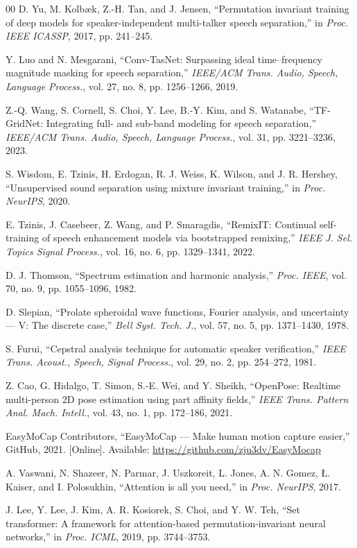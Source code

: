 \documentclass[conference]{IEEEtran}
\begin{document}
\begin{thebibliography}{00}
 D. Yu, M. Kolb\ae{}k, Z.-H. Tan, and J. Jensen,
``Permutation invariant training of deep models for speaker-independent
multi-talker speech separation,'' in \emph{Proc. IEEE ICASSP}, 2017,
pp. 241--245.

 Y. Luo and N. Mesgarani, ``Conv-TasNet:
Surpassing ideal time--frequency magnitude masking for speech separation,''
\emph{IEEE/ACM Trans. Audio, Speech, Language Process.}, vol. 27, no. 8,
pp. 1256--1266, 2019.

 Z.-Q. Wang, S. Cornell, S. Choi, Y. Lee,
B.-Y. Kim, and S. Watanabe, ``TF-GridNet: Integrating full- and sub-band
modeling for speech separation,'' \emph{IEEE/ACM Trans. Audio, Speech,
Language Process.}, vol. 31, pp. 3221--3236, 2023.

 S. Wisdom, E. Tzinis, H. Erdogan, R. J. Weiss,
K. Wilson, and J. R. Hershey, ``Unsupervised sound separation using mixture
invariant training,'' in \emph{Proc. NeurIPS}, 2020.

 E. Tzinis, J. Casebeer, Z. Wang, and
P. Smaragdis, ``RemixIT: Continual self-training of speech enhancement models
via bootstrapped remixing,'' \emph{IEEE J. Sel. Topics Signal Process.},
vol. 16, no. 6, pp. 1329--1341, 2022.

 D. J. Thomson, ``Spectrum estimation and
harmonic analysis,'' \emph{Proc. IEEE}, vol. 70, no. 9, pp. 1055--1096, 1982.

 D. Slepian, ``Prolate spheroidal wave functions,
Fourier analysis, and uncertainty --- V: The discrete case,'' \emph{Bell Syst.
Tech. J.}, vol. 57, no. 5, pp. 1371--1430, 1978.

 S. Furui, ``Cepstral analysis technique for
automatic speaker verification,'' \emph{IEEE Trans. Acoust., Speech, Signal
Process.}, vol. 29, no. 2, pp. 254--272, 1981.

 Z. Cao, G. Hidalgo, T. Simon, S.-E. Wei, and
Y. Sheikh, ``OpenPose: Realtime multi-person 2D pose estimation using part
affinity fields,'' \emph{IEEE Trans. Pattern Anal. Mach. Intell.}, vol. 43,
no. 1, pp. 172--186, 2021.

 EasyMoCap Contributors, ``EasyMoCap --- Make human motion
capture easier,'' GitHub, 2021. [Online]. Available:
\url{https://github.com/zju3dv/EasyMocap}

 A. Vaswani, N. Shazeer, N. Parmar,
J. Uszkoreit, L. Jones, A. N. Gomez, {\L}. Kaiser, and I. Polosukhin,
``Attention is all you need,'' in \emph{Proc. NeurIPS}, 2017.

 J. Lee, Y. Lee, J. Kim, A. R. Kosiorek,
S. Choi, and Y. W. Teh, ``Set transformer: A framework for attention-based
permutation-invariant neural networks,'' in \emph{Proc. ICML}, 2019,
pp. 3744--3753.

\end{thebibliography}
\end{document}
